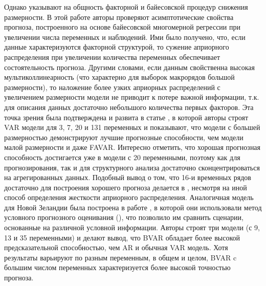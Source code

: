 \documentclass[11pt]{article} %
\begin{document}
Однако \cite{demol_al_2008} указывают на общность факторной и байесовской процедур снижения размерности. В этой работе авторы проверяют асимптотические свойства прогноза, построенного на основе байесовской многомерной регрессии при увеличении числа переменных и наблюдений. Ими было получено, что, если данные характеризуются факторной структурой, то сужение априорного распределения при увеличении количества переменных обеспечивает состоятельность прогноза. Другими словами, если данным свойственна высокая мультиколлинеарность (что характерно для выборок макрорядов большой размерности), то наложение более узких априорных распределений с увеличением размерности модели  не  приводит к потере важной информации, т.к. для описания данных достаточно небольшого количества первых факторов.  Эта точка зрения  была подтверждена и развита в статье \cite{banbura_al_2010}, в которой авторы  строят VAR модели для 3, 7, 20 и 131 переменных и показывают, что модели с большей размерностью демонстрируют лучшие прогнозные способности, чем модели малой размерности и даже FAVAR. Интересно отметить, что хорошая прогнозная способность достигается уже в модели с 20  переменными, поэтому как для прогнозирования, так и для структурного анализа достаточно сконцентрироваться на агрегированных данных. 
Подобный вывод о том, что 16-и временных рядов достаточно для построения хорошего прогноза делается в \cite{beauchemin_zaman_2011}, несмотря на иной способ определения жесткости априорного распределения. 
  Аналогичная модель для Новой Зеландии была построена в работе \cite{bloor_matheson_2010}, в которой они использовали метод условного прогнозного оценивания (\cite{waggoner_zha_1999}), что позволило им сравнить сценарии, основанные на различной условной информации.  Авторы строят три модели (с 9, 13 и 35 переменными) и  делают вывод, что BVAR обладает более высокой предсказательной способностью, чем AR и обычная VAR модель.  Хотя результаты варьируют по разным переменным, в общем и целом, BVAR c большим числом переменных характеризуется более высокой точностью прогноза.
\end{document}
